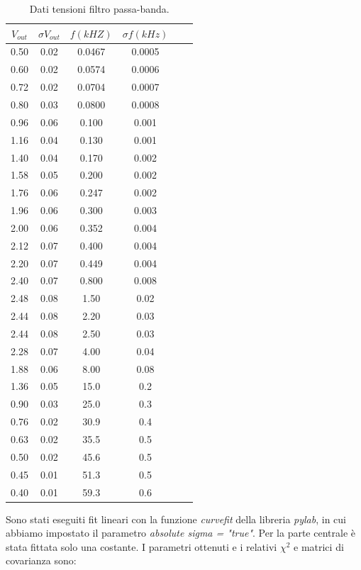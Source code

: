 \documentclass[10pt,a4paper]{article}
\begin{document}
\begin{table}[h]
\centering
\begin{tabular}{|c|c|c|c|c|c|}
\hline 
$V_{out}$ & $\sigma V_{out}$ & $f(kHZ)$ & $\sigma f(kHz)$ \\ 
\hline 
0.50 & 0.02 & 0.0467 & 0.0005 \\ 
\hline 
0.60 & 0.02 & 0.0574 & 0.0006 \\ 
\hline 
0.72 & 0.02 & 0.0704 & 0.0007 \\ 
\hline 
0.80 & 0.03 & 0.0800 & 0.0008 \\ 
\hline 
0.96 & 0.06 & 0.100 & 0.001 \\ 
\hline 
1.16 & 0.04 & 0.130 & 0.001 \\ 
\hline 
1.40 & 0.04 & 0.170 & 0.002 \\ 
\hline 
1.58 & 0.05 & 0.200 & 0.002 \\ 
\hline 
1.76 & 0.06 & 0.247 & 0.002 \\ 
\hline 
1.96 & 0.06 & 0.300 & 0.003 \\ 
\hline 
2.00 & 0.06 & 0.352 & 0.004 \\ 
\hline 
2.12 & 0.07 & 0.400 & 0.004 \\ 
\hline 
2.20 & 0.07 & 0.449 & 0.004 \\ 
\hline 
2.40 & 0.07 & 0.800 & 0.008 \\ 
\hline 
2.48 & 0.08 & 1.50 & 0.02 \\ 
\hline 
2.44 & 0.08 & 2.20 & 0.03 \\ 
\hline 
2.44 & 0.08 & 2.50 & 0.03 \\ 
\hline 
2.28 & 0.07 & 4.00 & 0.04 \\ 
\hline 
1.88 & 0.06 & 8.00 & 0.08 \\ 
\hline 
1.36 & 0.05 & 15.0 & 0.2 \\ 
\hline 
0.90 & 0.03 & 25.0 & 0.3 \\ 
\hline 
0.76 & 0.02 & 30.9 & 0.4 \\ 
\hline 
0.63 & 0.02 & 35.5 & 0.5 \\ 
\hline 
0.50 & 0.02 & 45.6 & 0.5 \\ 
\hline 
0.45 & 0.01 & 51.3 & 0.5 \\ 
\hline 
0.40 & 0.01 & 59.3 & 0.6 \\ 
\hline 
\end{tabular} 
\caption{Dati tensioni filtro passa-banda.}
\end{table}



Sono stati eseguiti fit lineari con la funzione \emph{curvefit} della libreria \emph{pylab}, in cui abbiamo impostato il parametro \emph{absolute sigma = "true"}. Per la parte centrale è stata fittata solo una costante. I parametri ottenuti e i relativi $\chi^2$ e matrici di covarianza sono:
\end{document}
